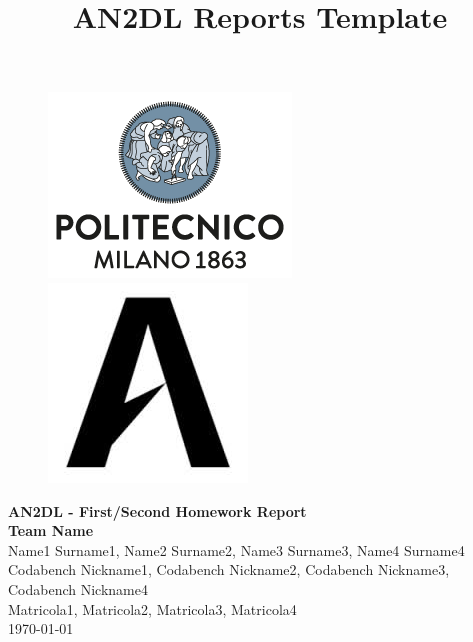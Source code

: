 \documentclass[11pt]{article}
\title{AN2DL Reports Template}
\begin{document}
    
    \begin{figure}[H]
        \raggedright
        \includegraphics[scale=0.4]{polimi.png} \hfill \includegraphics[scale=0.3]{airlab.jpeg}
    \end{figure}
    
    \vspace{5mm}
    
    \begin{center}
        {\Large \textbf{AN2DL - First/Second Homework Report}}\\
        \vspace{2mm}
        {\Large \textbf{Team Name}}\\
        \vspace{2mm}
        {\large Name1 Surname1,}
        {\large Name2 Surname2,}
        {\large Name3 Surname3,}
        {\large Name4 Surname4}\\
        \vspace{2mm}
        {Codabench Nickname1,}
        {Codabench Nickname2,}
        {Codabench Nickname3,}
        {Codabench Nickname4}\\
        \vspace{2mm}
        {Matricola1,}
        {Matricola2,}
        {Matricola3,}
        {Matricola4}\\
        \vspace{5mm}
        \today
    \end{center}    
    \vspace{5mm}
    
\end{document}
